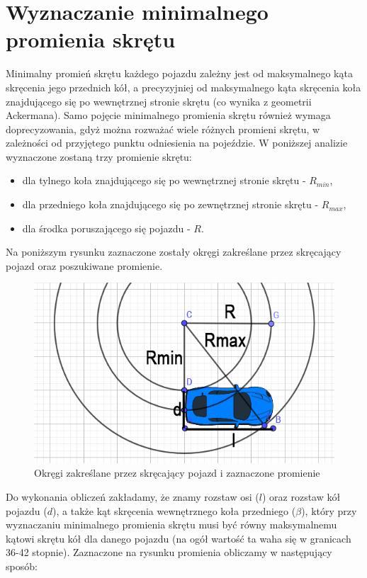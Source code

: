 \documentclass[a4paper,11pt,twoside]{report}
\theoremstyle{definition}
\begin{document}
\section{Wyznaczanie minimalnego promienia skrętu}

Minimalny promień skrętu każdego pojazdu zależny jest od maksymalnego kąta skręcenia jego przednich kół, a precyzyjniej od maksymalnego kąta skręcenia koła znajdującego się po wewnętrznej stronie skrętu (co wynika z geometrii Ackermana). Samo pojęcie minimalnego promienia skrętu również wymaga doprecyzowania, gdyż można rozważać wiele różnych promieni skrętu, w zależności od przyjętego punktu odniesienia na pojeździe. W poniższej analizie wyznaczone zostaną trzy promienie skrętu:
\begin{itemize}
	\item dla tylnego koła znajdującego się po wewnętrznej stronie skrętu - $R_{min}$,
	\item dla przedniego koła znajdującego się po zewnętrznej stronie skrętu - $R_{max}$,
	\item dla środka poruszającego się pojazdu - $R$.
\end{itemize}

Na poniższym rysunku zaznaczone zostały okręgi zakreślane przez skręcający pojazd oraz poszukiwane promienie.

\begin{figure}[h!]
\centering
\includegraphics[scale=0.4]{vehicleTurningRadius}
\caption[Okręgi zakreślane przez skręcający pojazd i zaznaczone promienie]{Okręgi zakreślane przez skręcający pojazd i zaznaczone promienie}
\end{figure}

Do wykonania obliczeń zakładamy, że znamy rozstaw osi ($l$) oraz rozstaw kół pojazdu ($d$), a także kąt skręcenia wewnętrznego koła przedniego ($\beta$), który przy wyznaczaniu minimalnego promienia skrętu musi być równy maksymalnemu kątowi skrętu kół dla danego pojazdu (na ogół wartość ta waha się w granicach 36-42 stopnie). Zaznaczone na rysunku promienia obliczamy w następujący sposób:
\end{document}
